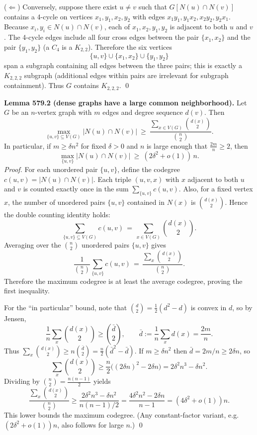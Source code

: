 ($\Leftarrow$) Conversely, suppose there exist $u\ne v$ such that $G[N(u)\cap N(v)]$ contains a 4-cycle on vertices $x_1,y_1,x_2,y_2$ with edges $x_1y_1,y_1x_2,x_2y_2,y_2x_1$.
Because $x_i,y_i\in N(u)\cap N(v)$, each of $x_1,x_2,y_1,y_2$ is adjacent to both $u$ and $v$.
The 4-cycle edges include all four cross edges between the pair $\{x_1,x_2\}$ and the pair $\{y_1,y_2\}$ (a $C_4$ is a $K_{2,2}$).
Therefore the six vertices
\[
\{u,v\}\cup\{x_1,x_2\}\cup\{y_1,y_2\}
\]
span a subgraph containing all edges between the three pairs; this is exactly a $K_{2,2,2}$ subgraph (additional edges within pairs are irrelevant for subgraph containment).
Thus $G$ contains $K_{2,2,2}$.
\qed

\medskip
\textbf{Lemma 579.2 (dense graphs have a large common neighborhood).}
Let $G$ be an $n$-vertex graph with $m$ edges and degree sequence $d(v)$. Then
\[
\max_{\{u,v\}\subseteq V(G)} |N(u)\cap N(v)| \ \ge\ \frac{\sum_{x\in V(G)} \binom{d(x)}{2}}{\binom{n}{2}}.
\]
In particular, if $m\ge \delta n^2$ for fixed $\delta>0$ and $n$ is large enough that $\frac{2m}{n}\ge 2$, then
\[
\max_{\{u,v\}} |N(u)\cap N(v)|\ \ge\ (2\delta^2+o(1))\,n.
\]
\emph{Proof.}
For each unordered pair $\{u,v\}$, define the codegree $c(u,v)=|N(u)\cap N(v)|$.
Each triple $(u,v,x)$ with $x$ adjacent to both $u$ and $v$ is counted exactly once in the sum $\sum_{\{u,v\}} c(u,v)$.
Also, for a fixed vertex $x$, the number of unordered pairs $\{u,v\}$ contained in $N(x)$ is $\binom{d(x)}{2}$.
Hence the double counting identity holds:
\[
\sum_{\{u,v\}\subseteq V(G)} c(u,v) \,=\, \sum_{x\in V(G)} \binom{d(x)}{2}.
\]
Averaging over the $\binom{n}{2}$ unordered pairs $\{u,v\}$ gives
\[
\frac{1}{\binom{n}{2}}\sum_{\{u,v\}} c(u,v) \,=\, \frac{\sum_x \binom{d(x)}{2}}{\binom{n}{2}}.
\]
Therefore the maximum codegree is at least the average codegree, proving the first inequality.

For the ``in particular'' bound, note that $\binom{d}{2}=\tfrac12(d^2-d)$ is convex in $d$, so by Jensen,
\[
\frac{1}{n}\sum_x \binom{d(x)}{2} \ge \binom{\bar d}{2},\qquad \bar d:=\frac{1}{n}\sum_x d(x)=\frac{2m}{n}.
\]
Thus $\sum_x \binom{d(x)}{2} \ge n\binom{\bar d}{2}=\frac{n}{2}(\bar d^2-\bar d)$.
If $m\ge \delta n^2$ then $\bar d=2m/n\ge 2\delta n$, so
\[
\sum_x \binom{d(x)}{2} \ge \frac{n}{2}\big((2\delta n)^2-2\delta n\big)=2\delta^2 n^3 - \delta n^2.
\]
Dividing by $\binom{n}{2}=\frac{n(n-1)}{2}$ yields
\[
\frac{\sum_x \binom{d(x)}{2}}{\binom{n}{2}} \ge \frac{2\delta^2 n^3-\delta n^2}{n(n-1)/2}
= \frac{4\delta^2 n^2-2\delta n}{n-1}
= (4\delta^2+o(1))n.
\]
This lower bounds the maximum codegree.
(Any constant-factor variant, e.g. $(2\delta^2+o(1))n$, also follows for large $n$.)
\qed

